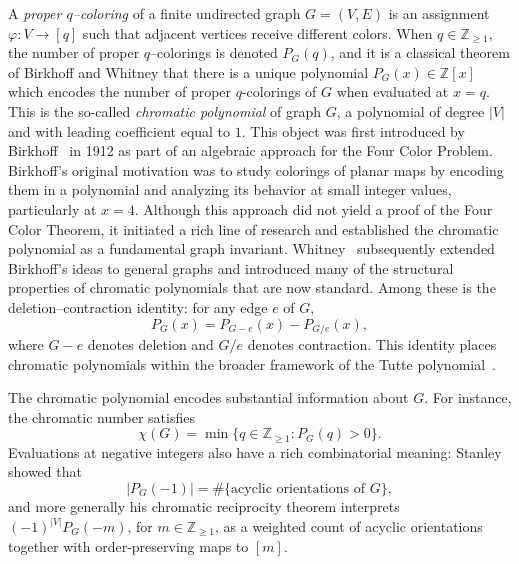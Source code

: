 \documentclass[A4paper,reqno,oneside,12pt]{amsart}
\theoremstyle{plain}
\theoremstyle{definition}
\begin{document}
A \emph{proper $q$--coloring} of a finite undirected graph $G=(V,E)$ is an assignment
$\varphi:V\to[q]$ such that adjacent vertices receive different colors.
When $q\in\mathbb{Z}_{\ge 1}$, the number of proper $q$--colorings is denoted $P_G(q)$, and it is a classical theorem of Birkhoff and Whitney that there is a unique polynomial $P_G(x)\in\mathbb{Z}[x]$ which encodes the number of proper $q$-colorings of $G$ when evaluated at $x=q$. This is the so-called {\it{chromatic polynomial}} of graph $G$, a polynomial of degree $|V|$ and with leading coefficient equal to $1$. This object was first introduced by Birkhoff~\cite{Birkhoff1912} in 1912 as part of an algebraic approach for the Four Color Problem. Birkhoff’s original motivation was to study colorings of planar maps by encoding them in a polynomial and analyzing its behavior at small integer values, particularly at $x=4$. Although this approach did not yield a proof of the Four Color Theorem, it initiated a rich line of research and established the chromatic polynomial as a fundamental graph invariant. Whitney~\cite{Whitney1932} subsequently extended Birkhoff’s ideas to general graphs and introduced many of the structural properties of chromatic polynomials that are now standard. Among these is the deletion--contraction identity: for any edge $e$ of $G$,
\begin{equation}
    P_G(x)=P_{G-e}(x)-P_{G/e}(x), \label{eq:dc-intro}
\end{equation}
where $G-e$ denotes deletion and $G/e$ denotes contraction.
This identity places chromatic polynomials within the broader framework of the Tutte polynomial~\cite{Tutte1954}.

The chromatic polynomial encodes substantial information about $G$.
For instance, the chromatic number satisfies
\[
\chi(G)=\min\{q\in\mathbb{Z}_{\ge 1}: P_G(q)>0\}.
\]
Evaluations at negative integers also have a rich combinatorial meaning:
Stanley~\cite{Stanley1973} showed that
\[
|P_G(-1)|=\#\{\text{acyclic orientations of }G\},
\]
and more generally his chromatic reciprocity theorem interprets $(-1)^{|V|}P_G(-m)$, for $m\in\mathbb{Z}_{\ge 1}$,
as a weighted count of acyclic orientations together with order-preserving maps to $[m]$. 

\medskip
\end{document}
